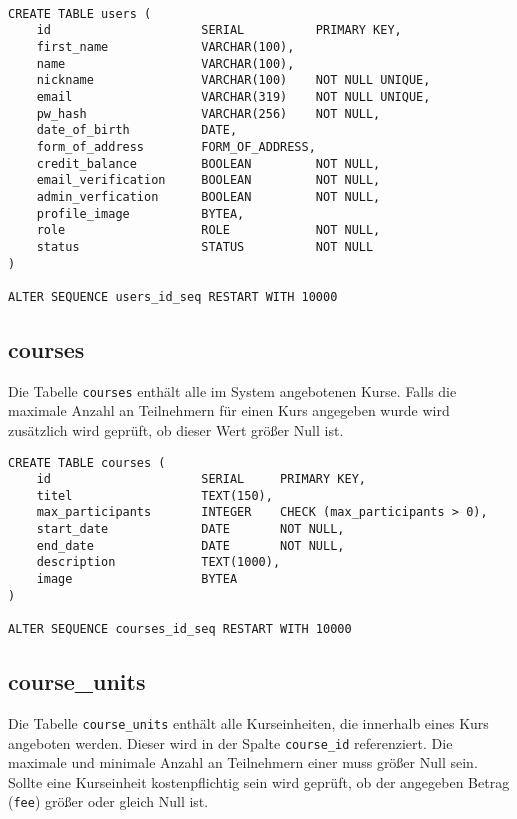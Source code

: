\begin{verbatim}

CREATE TABLE users (
    id                     SERIAL          PRIMARY KEY,
    first_name             VARCHAR(100),
    name                   VARCHAR(100),
    nickname               VARCHAR(100)    NOT NULL UNIQUE,
    email                  VARCHAR(319)    NOT NULL UNIQUE,
    pw_hash                VARCHAR(256)    NOT NULL,
    date_of_birth          DATE,
    form_of_address        FORM_OF_ADDRESS,
    credit_balance         BOOLEAN         NOT NULL,
    email_verification     BOOLEAN         NOT NULL,
    admin_verfication      BOOLEAN         NOT NULL,
    profile_image          BYTEA,
    role                   ROLE            NOT NULL,
    status                 STATUS          NOT NULL
)

ALTER SEQUENCE users_id_seq RESTART WITH 10000
\end{verbatim}

\subsection{courses}
Die Tabelle \texttt{courses} enthält alle im System angebotenen Kurse. Falls die maximale Anzahl an Teilnehmern für einen Kurs angegeben wurde wird zusätzlich wird geprüft, ob dieser Wert größer Null ist.

\begin{verbatim}
CREATE TABLE courses (
    id                     SERIAL     PRIMARY KEY,
    titel                  TEXT(150),
    max_participants       INTEGER    CHECK (max_participants > 0),
    start_date             DATE       NOT NULL,
    end_date               DATE       NOT NULL,
    description            TEXT(1000),
    image                  BYTEA
)

ALTER SEQUENCE courses_id_seq RESTART WITH 10000
\end{verbatim}

\subsection{course\_units}
Die Tabelle \texttt{course\_units} enthält alle Kurseinheiten, die innerhalb eines Kurs angeboten werden. Dieser wird in der Spalte \texttt{course\_id} referenziert. Die maximale und minimale Anzahl an Teilnehmern einer muss größer Null sein. Sollte eine Kurseinheit kostenpflichtig sein wird geprüft, ob der angegeben Betrag (\texttt{fee}) größer oder gleich Null ist.

